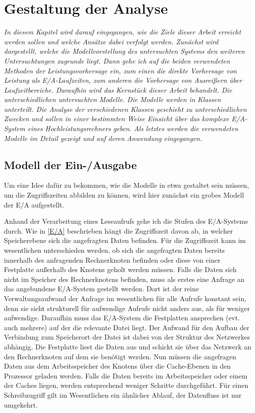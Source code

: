 \documentclass[
	12pt,
	a4paper,
	BCOR10mm,
	DIV14,
	listof=totoc,
	bibliography=totoc,
	headsepline
]{scrreprt}
\begin{document}
\chapter{Gestaltung der Analyse}
\textit{
In diesem Kapitel wird darauf eingegangen, wie die Ziele dieser Arbeit erreicht werden sollen und welche Ansätze dabei verfolgt werden.
Zunächst wird dargestellt, welche die Modellvorstellung des untersuchten Systems 	den weiteren Untersuchtungen zugrunde liegt.
Dann gehe ich auf die beiden verwendeten Methoden der Leistungsvorhersage ein, zum einen die direkte Vorhersage von Leistung als E/A-Laufzeiten, zum anderen die Vorhersage von Ausreißern über Laufzeitbereiche. 
Daraufhin wird das Kernstück dieser Arbeit behandelt. Die unterschiedlichen untersuchten Modelle. Die Modelle werden in Klassen unterteilt. Die Analyse der verschiedenen Klassen geschieht zu unterschiedlichen Zwecken und sollen in einer bestimmten Weise Einsicht über das komplexe E/A-System eines Hochleistungsrechners geben. Als letztes werden die verwendeten Modelle im Detail gezeigt und auf deren Anwendung eingegangen.
}
\bigskip

\section{Modell der Ein-/Ausgabe}
\label{ea_modell}
Um eine Idee dafür zu bekommen, wie die Modelle in etwa gestaltet sein müssen, um die Zugriffszeiten abbilden zu können, wird hier zunächst ein grobes Modell der E/A aufgestellt.

Anhand der Verarbeitung eines Leseaufrufs gehe ich die Stufen des E/A-Systems durch. Wie in \ref{E/A} beschrieben hängt die Zugriffszeit davon ab, in welcher Speicherebene sich die angefragten Daten befinden.
Für die Zugriffszeit kann im wesentlichen unterschieden werden, ob sich die angefragten Daten bereits innerhalb des anfragenden Rechnerknoten befinden oder diese von einer Festplatte außerhalb des Knotens geholt werden müssen.
Falls die Daten sich nicht im Speicher des Rechnerknotens befinden, muss als erstes eine Anfrage an das angebundene E/A-System gestellt werden.
Dort ist der reine Verwaltungsaufwand der Anfrage im wesentlichen für alle Aufrufe konstant sein, denn sie sieht strukturell für aufwendige Aufrufe nicht anders aus, als für weniger aufwendige.
Daraufhin muss das E/A-System die Festplatten ansprechen (evt. auch mehrere) auf der die relevante Datei liegt. Der Aufwand für den Aufbau der Verbindung zum Speicherort der Datei ist dabei von der Struktur des Netzwerkes abhängig. Die Festplatte liest die Daten aus und schickt sie über das Netzwerk an den Rechnerknoten auf dem sie benötigt werden.
Nun müssen die angefragen Daten aus dem Arbeitsspeicher des Knotens über die Cache-Ebenen in den Prozessor geladen werden. 
Falls die Daten bereits im Arbeitsspeicher oder einem der Caches liegen, werden entsprechend weniger Schritte durchgeführt.
Für einen Schreibzugriff gilt im Wesentlichen ein ähnlicher Ablauf, der Datenfluss ist nur umgekehrt.
\end{document}
